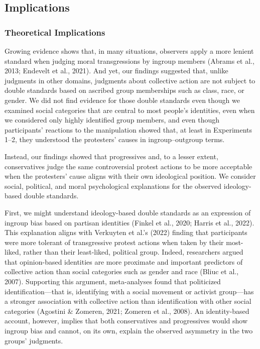 \documentclass[12pt, letterpaper]{article}
\begin{document}
\hypertarget{implications}{%
\subsection{Implications}\label{implications}}

\hypertarget{theoretical-implications}{%
\subsubsection{Theoretical
Implications}\label{theoretical-implications}}

Growing evidence shows that, in many situations, observers apply a more
lenient standard when judging moral transgressions by ingroup members
(Abrams et al., 2013; Endevelt et al., 2021). And yet, our findings
suggested that, unlike judgments in other domains, judgments about
collective action are not subject to double standards based on ascribed
group memberships such as class, race, or gender. We did not find
evidence for those double standards even though we examined social
categories that are central to most people's identities, even when we
considered only highly identified group members, and even though
participants' reactions to the manipulation showed that, at least in
Experiments 1--2, they understood the protesters' causes in
ingroup--outgroup terms.

Instead, our findings showed that progressives and, to a lesser extent,
conservatives judge the same controversial protest actions to be more
acceptable when the protesters' cause aligns with their own ideological
position. We consider social, political, and moral psychological
explanations for the observed ideology-based double standards.

First, we might understand ideology-based double standards as an
expression of ingroup bias based on partisan identities (Finkel et al.,
2020; Harris et al., 2022). This explanation aligns with Verkuyten et
al.'s (2022) finding that participants were more tolerant of
transgressive protest actions when taken by their most-liked, rather
than their least-liked, political group. Indeed, researchers argued that
opinion-based identities are more proximate and important predictors of
collective action than social categories such as gender and race (Bliuc
et al., 2007). Supporting this argument, meta-analyses found that
politicized identification---that is, identifying with a social movement
or activist group---has a stronger association with collective action
than identification with other social categories (Agostini \& Zomeren,
2021; Zomeren et al., 2008). An identity-based account, however, implies
that both conservatives and progressives would show ingroup bias and
cannot, on its own, explain the observed asymmetry in the two groups'
judgments.
\end{document}
